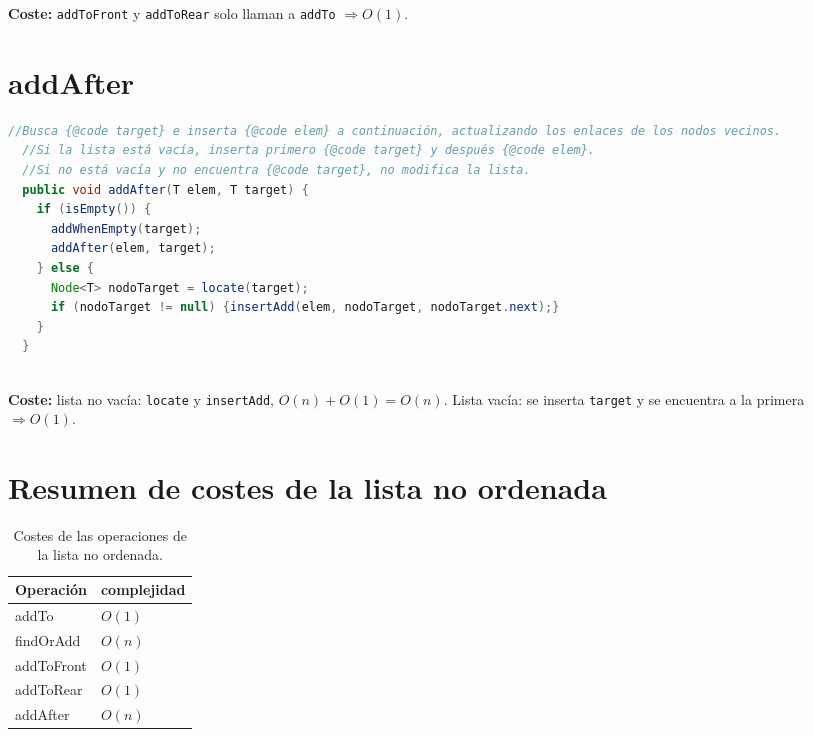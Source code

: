 \documentclass[a4paper,11pt]{report}
\newcommand{\coste}[1]{\par\bigskip\noindent\textbf{Coste:} #1\par\bigskip}
\begin{document}
\coste{\texttt{addToFront} y \texttt{addToRear} solo llaman a \texttt{addTo} $\Rightarrow O(1)$.}

\begin{minipage}{0.95\linewidth}
\section{\label{addAfter}addAfter}
\begin{lstlisting}[language=Java]
  //Busca {@code target} e inserta {@code elem} a continuación, actualizando los enlaces de los nodos vecinos. 
  //Si la lista está vacía, inserta primero {@code target} y después {@code elem}.
  //Si no está vacía y no encuentra {@code target}, no modifica la lista.
  public void addAfter(T elem, T target) {
    if (isEmpty()) {
      addWhenEmpty(target);
      addAfter(elem, target);
    } else {
      Node<T> nodoTarget = locate(target);
      if (nodoTarget != null) {insertAdd(elem, nodoTarget, nodoTarget.next);}
    }
  }
 
\end{lstlisting}
\end{minipage}\smallskip

\coste{lista no vacía: \texttt{locate} y \texttt{insertAdd}, $O(n) + O(1) = O(n)$. Lista vacía: se inserta \texttt{target} y se encuentra a la primera $\Rightarrow O(1)$.}

\begin{table}[ht]
\section{\label{tablaResumenUnordered}Resumen de costes de la lista no ordenada}
\begin{minipage}{0.95\linewidth}
\centering
\renewcommand{\arraystretch}{1.3}
\begin{tabular}{>{\ttfamily}l l}
\toprule
\normalfont Operación & complejidad\\
\midrule
addTo & $O(1)$\\
findOrAdd & $O(n)$\\
addToFront & $O(1)$\\
addToRear & $O(1)$\\
addAfter & $O(n)$\\


\bottomrule
\end{tabular}
\caption{Costes de las operaciones de la lista no ordenada.}
\end{minipage}\smallskip
\end{table}
\end{document}
